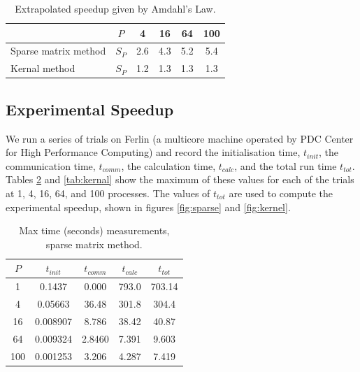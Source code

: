 \documentclass[a4paper,11pt]{article}
\begin{document}
\begin{table}[h]
\def\arraystretch{1.2}
\begin{center}
\caption{Extrapolated speedup given by Amdahl's Law.}
\label{tab:S_extrap}
\begin{tabular}{| l | c | c | c | c | c |}
\hline
&$P$ & 4 & 16 & 64 & 100 \\
\hline
Sparse matrix method & $S_P $& 2.6 & 4.3 & 5.2 & 5.4\\
\hline
Kernal method & $S_P $& 1.2 & 1.3 & 1.3 & 1.3\\
\hline
\end{tabular}
\end{center}
\end{table}

\subsection*{Experimental Speedup}
We run a series of trials on Ferlin (a multicore machine operated by PDC Center for High Performance Computing) and record the initialisation time, $t_{init}$, the communication time, $t_{comm}$, the calculation time, $t_{calc}$, and the total run time $t_{tot}$.  Tables \ref{tab:matrix} and \ref{tab:kernal} show the maximum of these values for each of the trials at 1, 4, 16, 64, and 100 processes.  The values of $t_{tot}$ are used to compute the experimental speedup, shown in figures \ref{fig:sparse} and \ref{fig:kernel}.

\begin{table}[h]
\def\arraystretch{1.2}
\begin{center}
\caption{Max time (seconds) measurements, sparse matrix method.}
\label{tab:matrix}
\begin{tabular}{| c | c | c | c | c |}
\hline
$P$ & $t_{init}$ & $t_{comm}$ & $t_{calc}$ & $t_{tot}$ \\
\hline
1 & 0.1437 &  0.000 & 793.0 & 703.14\\
\hline
4 & 0.05663 & 36.48 & 301.8 & 304.4\\
\hline
16 & 0.008907 & 8.786 & 38.42 & 40.87\\
\hline
64 & 0.009324 & 2.8460 & 7.391 & 9.603\\
\hline
100 & 0.001253 & 3.206 & 4.287 & 7.419\\
\hline
\end{tabular}
\end{center}
\end{table}
\end{document}
